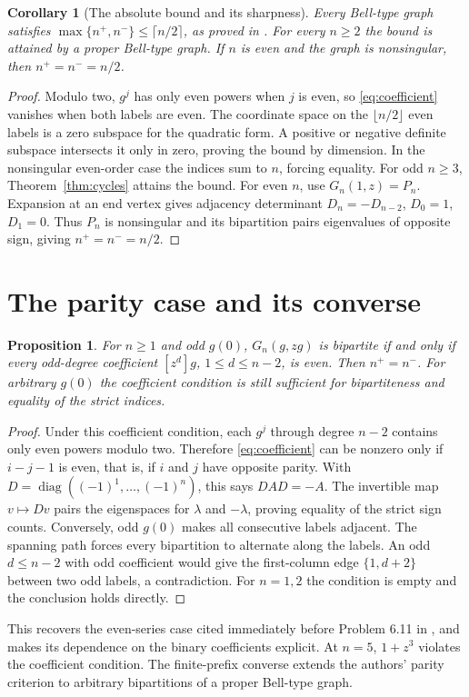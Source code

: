 \documentclass[11pt]{article}
\newtheorem{corollary}[theorem]{Corollary}
\newtheorem{proposition}[theorem]{Proposition}
\newcommand{\np}{n^+}
\newcommand{\nm}{n^-}
\begin{document}
\begin{corollary}[The absolute bound and its sharpness]\label{cor:bound}
Every Bell-type graph satisfies
$\max\{\np,\nm\}\leq\lceil n/2\rceil$, as proved in
\cite[Corollary 6.6, p.~24]{CJKM}. For every $n\geq2$ the bound is
attained by a proper Bell-type graph. If $n$ is even and the graph is
nonsingular, then $\np=\nm=n/2$.
\end{corollary}
\begin{proof}
Modulo two, $g^j$ has only even powers when $j$ is even, so
\eqref{eq:coefficient} vanishes when both labels are even.
The coordinate space on the $\lfloor n/2\rfloor$ even labels is a
zero subspace for the quadratic form. A positive or negative definite
subspace intersects it only in zero, proving the bound by dimension.
In the nonsingular even-order case the indices sum to $n$, forcing
equality. For odd $n\geq3$, Theorem~\ref{thm:cycles} attains the bound.
For even $n$, use $G_n(1,z)=P_n$. Expansion at an end vertex gives
adjacency determinant $D_n=-D_{n-2}$, $D_0=1$, $D_1=0$.
Thus $P_n$ is nonsingular and its bipartition pairs eigenvalues of
opposite sign, giving $\np=\nm=n/2$.
\end{proof}

\section{The parity case and its converse}
\begin{proposition}\label{prop:even}
For $n\geq1$ and odd $g(0)$, $G_n(g,zg)$ is bipartite if and only if
every odd-degree coefficient $[z^d]g$, $1\leq d\leq n-2$, is even.
Then $\np=\nm$. For arbitrary $g(0)$ the coefficient condition is
still sufficient for bipartiteness and equality of the strict indices.
\end{proposition}
\begin{proof}
Under this coefficient condition, each $g^j$ through degree $n-2$
contains only even powers modulo two. Therefore
\eqref{eq:coefficient} can be nonzero only if $i-j-1$ is even, that is,
if $i$ and $j$ have opposite parity. With
$D=\operatorname{diag}((-1)^1,\ldots,(-1)^n)$, this says $DAD=-A$.
The invertible map $v\mapsto Dv$ pairs the eigenspaces for $\lambda$
and $-\lambda$, proving equality of the strict sign counts.
Conversely, odd $g(0)$ makes all consecutive labels adjacent.
The spanning path forces every bipartition to alternate along the
labels. An odd $d\leq n-2$ with odd coefficient would give the
first-column edge $\{1,d+2\}$ between two odd labels, a contradiction.
For $n=1,2$ the condition is empty and the conclusion holds directly.
\end{proof}
This recovers the even-series case cited immediately before
Problem 6.11 in \cite{CJKM}, and makes its dependence on the binary
coefficients explicit. At $n=5$, $1+z^3$ violates the coefficient
condition. The finite-prefix converse extends the authors' parity
criterion to arbitrary bipartitions of a proper Bell-type graph.
\end{document}
